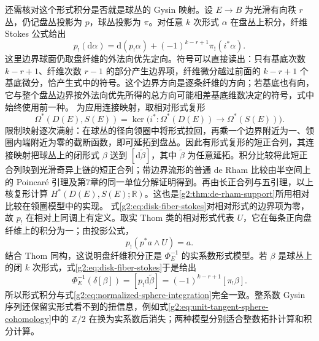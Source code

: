 还需核对这个形式积分是否就是球丛的 Gysin 映射。设 \(E\to B\) 为光滑有向秩 \(r\) 丛，仍记盘丛投影为 \(p\)，球丛投影为 \(\pi\)。对任意 \(k\) 次形式 \(\alpha\) 在盘丛上积分，纤维 Stokes 公式给出
\begin{equation}\label{g2:eq:disk-fiber-stokes}
	p_!(\mathrm d\alpha)=\mathrm d(p_!\alpha)+(-1)^{k-r+1}\pi_!(i^*\alpha).
\end{equation}
这里边界球面仍取盘纤维的外法向优先定向。符号可以直接读出：只有基底次数 \(k-r+1\)、纤维次数 \(r-1\) 的部分产生边界项，纤维微分越过前面的 \(k-r+1\) 个基底微分，恰产生式中的符号。这个边界方向是逐条纤维的方向；若基底也有向，它与整个盘丛边界按外法向优先所得的总方向可能相差基底维数决定的符号，式中始终使用前一种。
\ProseParagraphBreak
为应用连接映射，取相对形式复形
\[
	\Omega^*(D(E),S(E))=\ker\bigl(i^*:\Omega^*(D(E))\to\Omega^*(S(E))\bigr).
\]
限制映射逐次满射：在球丛的径向领圈中将形式拉回，再乘一个边界附近为一、领圈内端附近为零的截断函数，即可延拓到盘丛。因此有形式复形的短正合列，其连接映射把球丛上的闭形式 \(\beta\) 送到 \([\mathrm d\widetilde\beta]\)，其中 \(\widetilde\beta\) 为任意延拓。积分比较将此短正合列映到光滑奇异上链的短正合列；带边界流形的普通 de Rham 比较由半空间上的 Poincaré 引理及第7章的同一单位分解证明得到。再由长正合列与五引理，以上核复形计算 \(H^*(D(E),S(E);\mathbb R)\)。这也是\cref{g2:thm:de-rham-support}所用相对比较在领圈模型中的实现。
\ProseParagraphBreak
式\eqref{g2:eq:disk-fiber-stokes}对相对形式的边界项为零，故 \(p_!\) 在相对上同调上有定义。取实 Thom 类的相对形式代表 \(U\)，它在每条正向盘纤维上的积分为一；由投影公式，
\[
	p_!(p^*a\wedge U)=a.
\]
结合 Thom 同构，这说明盘纤维积分正是 \(\Phi_E^{-1}\) 的实系数形式模型。若 \(\beta\) 是球丛上的闭 \(k\) 次形式，式\eqref{g2:eq:disk-fiber-stokes}于是给出
\[
	\Phi_E^{-1}(\delta[\beta])=[p_!\mathrm d\widetilde\beta]
	=(-1)^{k-r+1}[\pi_!\beta].
\]
所以形式积分与式\eqref{g2:eq:normalized-sphere-integration}完全一致。整系数 Gysin 序列还保留实形式看不到的扭信息，例如式\eqref{g2:eq:unit-tangent-sphere-cohomology}中的 \(\mathbb Z/2\) 在换为实系数后消失；两种模型分别适合整数拓扑计算和积分计算。
